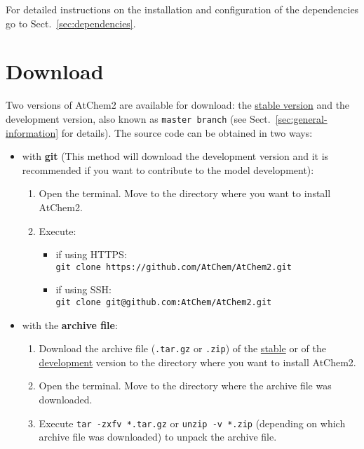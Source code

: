 For detailed instructions on the installation and configuration of the
dependencies go to Sect.~\ref{sec:dependencies}.

\section{Download} \label{sec:download}

Two versions of AtChem2 are available for download: the
\href{https://github.com/AtChem/AtChem2/releases}{stable version} and
the development version, also known as \texttt{master\ branch} (see
Sect.~\ref{sec:general-information} for details). The source code can
be obtained in two ways:

\begin{itemize}
\item with \textbf{git} (This method will download the development
  version and it is recommended if you want to contribute to the model
  development):
  \begin{enumerate}
  \item Open the terminal. Move to the directory where you want to
    install AtChem2.
  \item Execute:
    \begin{itemize}
      \item if using HTTPS:\\
        \verb|git clone https://github.com/AtChem/AtChem2.git|
      \item if using SSH:\\
        \verb|git clone git@github.com:AtChem/AtChem2.git|
    \end{itemize}
  \end{enumerate}
\item with the \textbf{archive file}:
  \begin{enumerate}
  \item Download the archive file (\texttt{.tar.gz} or \texttt{.zip}) of the
    \href{https://github.com/AtChem/AtChem2/releases/}{stable} or of the
    \href{https://github.com/AtChem/AtChem2/archive/master.zip}{development}
    version to the directory where you want to install AtChem2.
  \item Open the terminal. Move to the directory where the archive
    file was downloaded.
  \item Execute \verb|tar -zxfv *.tar.gz| or \verb|unzip -v *.zip|
    (depending on which archive file was downloaded) to unpack the
    archive file.
  \end{enumerate}
\end{itemize}

